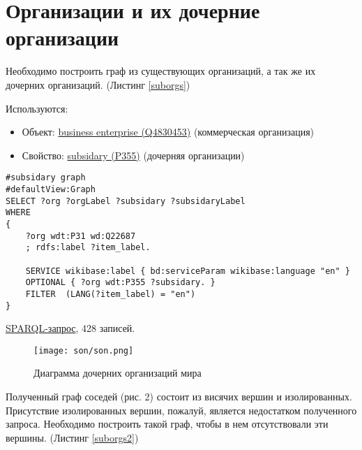 \section*{Организации и их дочерние организации}

Необходимо построить граф из существующих организаций, а так же их дочерних организаций. (Листинг \ref{suborgs})

Используются:
\begin{itemize}
    \item Объект: \href{https://www.wikidata.org/wiki/Q4830453}{business enterprise (Q4830453)} (коммерческая организация)
    \item Свойство: \href{https://www.wikidata.org/wiki/Property:P355}{subsidary (P355)} (дочерняя организации)
\end{itemize}

\begin{lstlisting}[language=SPARQL,label=suborgs,caption=Граф родительских и дочерных организаций]
#subsidary graph
#defaultView:Graph
SELECT ?org ?orgLabel ?subsidary ?subsidaryLabel
WHERE
{
    ?org wdt:P31 wd:Q22687
    ; rdfs:label ?item_label.

    SERVICE wikibase:label { bd:serviceParam wikibase:language "en" }
    OPTIONAL { ?org wdt:P355 ?subsidary. }
    FILTER  (LANG(?item_label) = "en") 
}
\end{lstlisting}

\href{https://query.wikidata.org/#%23neighboring%20countries%20graph%0A%23defaultView%3AGraph%0ASELECT%20%3Forg%20%3ForgLabel%20%3Fsubsidary%20%3FsubsidaryLabel%0AWHERE%0A%7B%0A%20%20%20%20%3Forg%20wdt%3AP31%20wd%3AQ22687%0A%20%20%20%20%3B%20rdfs%3Alabel%20%3Fitem_label%20.%0A%0A%20%20%20%20SERVICE%20wikibase%3Alabel%20%7B%20bd%3AserviceParam%20wikibase%3Alanguage%20%22en%22%20%7D%0A%20%20%20%20OPTIONAL%20%7B%20%3Forg%20wdt%3AP355%20%3Fsubsidary%20.%20%7D%0A%20%20%20%20FILTER%20%20%28LANG%28%3Fitem_label%29%20%3D%20%22en%22%29%20%0A%7D%0A}{SPARQL-запрос}, 428 записей.
	
\begin{figure}[h]
	\texttt{[image: son/son.png]}
	\centering
	\caption{Диаграмма дочерних организаций мира}
	\centering
\end{figure}

Полученный граф соседей (рис. 2) состоит из висячих вершин и изолированных. Присутствие изолированных вершин, пожалуй, является недостатком полученного запроса. Необходимо построить такой граф, чтобы в нем отсутствовали эти вершины. (Листинг \ref{suborgs2})


